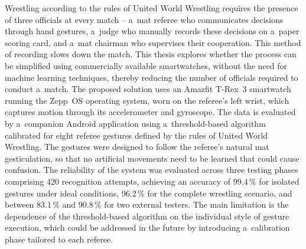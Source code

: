 Wrestling according to the rules of United World Wrestling
requires the presence of three officials at every match
-- a~mat referee who communicates decisions through hand
gestures, a~judge who manually records these decisions on
a~paper scoring card, and a~mat chairman who supervises
their cooperation. This method of recording slows down
the match. This thesis explores whether the process can
be simplified using commercially available smartwatches,
without the need for machine learning techniques, thereby
reducing the number of officials required to conduct
a~match. The proposed solution uses an Amazfit T-Rex~3
smartwatch running the Zepp~OS operating system, worn on
the referee's left wrist, which captures motion through
its accelerometer and gyroscope. The data is evaluated 
by a~companion Android application using
a~threshold-based algorithm calibrated for eight referee
gestures defined by the rules of United World Wrestling.
The gestures were designed to follow the referee's
natural mat gesticulation, so that no artificial movements
need to be learned that could cause confusion. The
reliability of the system was evaluated across three
testing phases comprising 420 recognition attempts,
achieving an accuracy of 99.4\,\% for isolated gestures
under ideal conditions, 96.2\,\% for the complete
wrestling scenario, and between 83.1\,\% and 90.8\,\% for
two external testers. The main limitation is the
dependence of the threshold-based algorithm on the
individual style of gesture execution, which could be
addressed in the future by introducing a~calibration
phase tailored to each referee.